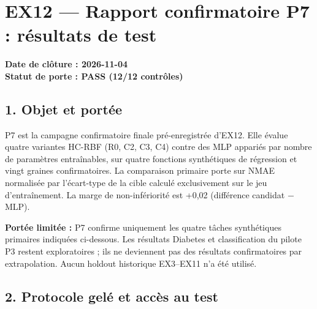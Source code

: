 \documentclass[
]{article}
\author{}
\date{}
\begin{document}
{
\setcounter{tocdepth}{3}
\tableofcontents
}
\section{EX12 --- Rapport confirmatoire P7 : résultats de
test}\label{ex12-rapport-confirmatoire-p7-ruxe9sultats-de-test}

\textbf{Date de clôture : 2026-11-04}\\
\textbf{Statut de porte : PASS (12/12 contrôles)}

\subsection{1. Objet et portée}\label{objet-et-portuxe9e}

P7 est la campagne confirmatoire finale pré-enregistrée d'EX12. Elle
évalue quatre variantes HC-RBF (R0, C2, C3, C4) contre des MLP appariés
par nombre de paramètres entraînables, sur quatre fonctions synthétiques
de régression et vingt graines confirmatoires. La comparaison primaire
porte sur NMAE normalisée par l'écart-type de la cible calculé
exclusivement sur le jeu d'entraînement. La marge de non-infériorité est
+0,02 (différence candidat − MLP).

\textbf{Portée limitée :} P7 confirme uniquement les quatre tâches
synthétiques primaires indiquées ci-dessous. Les résultats Diabetes et
classification du pilote P3 restent exploratoires ; ils ne deviennent
pas des résultats confirmatoires par extrapolation. Aucun holdout
historique EX3--EX11 n'a été utilisé.

\subsection{2. Protocole gelé et accès au
test}\label{protocole-geluxe9-et-accuxe8s-au-test}
\end{document}
